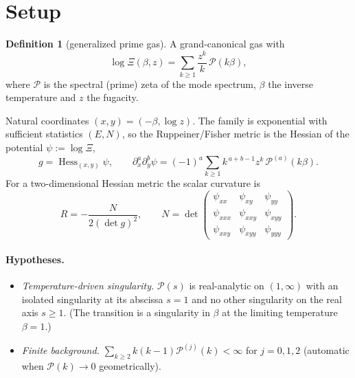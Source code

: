 \documentclass[a4paper,11pt]{article}
\theoremstyle{plain}
\theoremstyle{definition}
\newtheorem{definition}{Definition}
\theoremstyle{remark}
\newcommand{\Ric}{R}                 %
\newcommand{\Hess}{\operatorname{Hess}}
\newcommand{\detg}{\det g}
\begin{document}
\section{Setup}\label{sec:setup}

\begin{definition}[generalized prime gas]\label{def:gas}
A grand-canonical gas with
\begin{equation}\label{eq:logXi}
   \log\Xi(\beta,z)=\sum_{k\ge1}\frac{z^k}{k}\,\mathcal P(k\beta),
\end{equation}
where $\mathcal P$ is the spectral (prime) zeta of the mode spectrum, $\beta$ the
inverse temperature and $z$ the fugacity.
\end{definition}

Natural coordinates $(x,y)=(-\beta,\log z)$. The family is exponential with sufficient
statistics $(E,N)$, so the Ruppeiner/Fisher metric is the Hessian of the potential
$\psi:=\log\Xi$,
\begin{equation}\label{eq:metric}
   g=\Hess_{(x,y)}\psi,\qquad
   \partial_x^{a}\partial_y^{b}\psi=(-1)^{a}\sum_{k\ge1}k^{\,a+b-1}z^{k}\,\mathcal P^{(a)}(k\beta).
\end{equation}
For a two-dimensional Hessian metric the scalar curvature is
\begin{equation}\label{eq:R}
   \Ric=-\frac{N}{2(\detg)^{2}},\qquad
   N=\det\!\begin{pmatrix}
       \psi_{xx} & \psi_{xy} & \psi_{yy}\\
       \psi_{xxx}& \psi_{xxy}& \psi_{xyy}\\
       \psi_{xxy}& \psi_{xyy}& \psi_{yyy}
     \end{pmatrix}.
\end{equation}

\paragraph{Hypotheses.}
\begin{itemize}
\item[\textbf{(H1)}] \emph{Temperature-driven singularity.} $\mathcal P(s)$ is real-analytic
on $(1,\infty)$ with an isolated singularity at its abscissa $s=1$ and no other singularity
on the real axis $s\ge1$. (The transition is a singularity in $\beta$ at the limiting
temperature $\beta=1$.)
\item[\textbf{(H2)}] \emph{Finite background.} $\sum_{k\ge2}k(k-1)\mathcal P^{(j)}(k)<\infty$
for $j=0,1,2$ (automatic when $\mathcal P(k)\to0$ geometrically).
\end{itemize}
\end{document}
